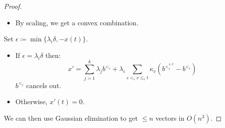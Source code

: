 \documentclass[11pt, a4paper]{article}
\newcommand{\set}[1]{\{#1\}}
\theoremstyle{remark}
\theoremstyle{definition}
\begin{document}
\begin{proof}
\begin{itemize}
			\item By scaling, we get a convex combination.
	\end{itemize}
	Set $\epsilon\coloneqq\min\set{\lambda_i\delta, -x(t)}$.
	\begin{itemize}
		\item
		If $\epsilon=\lambda_i\delta$ then:
		\[x'=\sum_{j=1}^k \lambda_jb^{<_i}+\lambda_i\sum_{s<_i v\leq_i t}\kappa_v(b^{<_i^{s,v}}-b^{<_i})\]
		$b^{<_i}$ cancels out.

		\item
		Otherwise, $x'(t)=0$.
	\end{itemize}
	We can then use Gaussian elimination to get $\leq n$ vectors in $O(n^3)$.
\end{proof}

\end{document}
